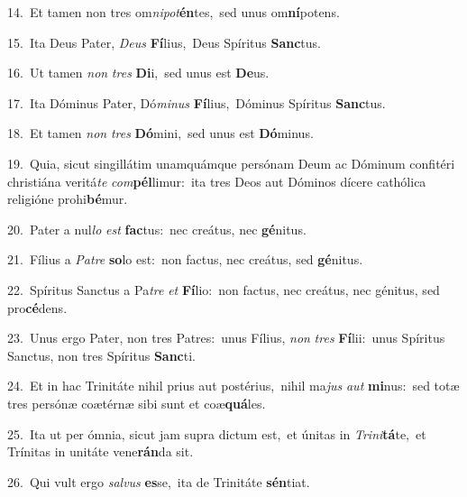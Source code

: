 {\numbfont\textcolor{\numbcolor}{14.}}~Et tamen non tres om\-\textit{ni}\-\textit{pot}\textbf{én}tes,~\star sed unus om\-\textbf{ní}\-potens.\par
{\numbfont\textcolor{\numbcolor}{15.}}~Ita Deus Pater, \textit{De}\-\textit{us} \textbf{Fí}\-lius,~\star Deus Spíritus \textbf{Sanc}\-tus.\par
{\numbfont\textcolor{\numbcolor}{16.}}~Ut tamen \textit{non} \textit{tres} \textbf{Di}\-i,~\star sed unus est \textbf{De}\-us.\par
{\numbfont\textcolor{\numbcolor}{17.}}~Ita Dóminus Pater, Dó\-\textit{mi}\-\textit{nus} \textbf{Fí}\-lius,~\star Dóminus Spíritus \textbf{Sanc}\-tus.\par
{\numbfont\textcolor{\numbcolor}{18.}}~Et tamen \textit{non} \textit{tres} \textbf{Dó}\-mini,~\star sed unus est \textbf{Dó}\-minus.\par
{\numbfont\textcolor{\numbcolor}{19.}}~Quia, sicut singillátim unamquámque persónam Deum ac Dóminum confitéri christiána veritá\textit{te} \textit{com}\-\textbf{pél}limur:~\star ita tres Deos aut Dóminos dícere cathólica religióne prohi\-\textbf{bé}\-mur.\par
{\numbfont\textcolor{\numbcolor}{20.}}~Pater a nul\textit{lo} \textit{est} \textbf{fac}\-tus:~\star nec creátus, nec \textbf{gé}\-nitus.\par
{\numbfont\textcolor{\numbcolor}{21.}}~Fílius a \textit{Pa}\-\textit{tre} \textbf{so}\-lo est:~\star non factus, nec creátus, sed \textbf{gé}\-nitus.\par
{\numbfont\textcolor{\numbcolor}{22.}}~Spíritus Sanctus a Pa\textit{tre} \textit{et} \textbf{Fí}\-lio:~\star non factus, nec creátus, nec génitus, sed pro\-\textbf{cé}\-dens.\par
{\numbfont\textcolor{\numbcolor}{23.}}~Unus ergo Pater, non tres Patres:~\dagger unus Fílius, \textit{non} \textit{tres} \textbf{Fí}\-lii:~\star unus Spíritus Sanctus, non tres Spíritus \textbf{Sanc}\-ti.\par
{\numbfont\textcolor{\numbcolor}{24.}}~Et in hac Trinitáte nihil prius aut postérius,~\dagger nihil ma\textit{jus} \textit{aut} \textbf{mi}\-nus:~\star sed totæ tres persónæ coætérnæ sibi sunt et coæ\-\textbf{quá}\-les.\par
{\numbfont\textcolor{\numbcolor}{25.}}~Ita ut per ómnia, sicut jam supra dictum est,~\dagger et únitas in \textit{Tri}\-\textit{ni}\textbf{tá}te,~\star et Trínitas in unitáte vene\-\textbf{rán}\-da sit.\par
{\numbfont\textcolor{\numbcolor}{26.}}~Qui vult ergo \textit{sal}\-\textit{vus} \textbf{es}\-se,~\star ita de Trinitáte \textbf{sén}\-tiat.\par
